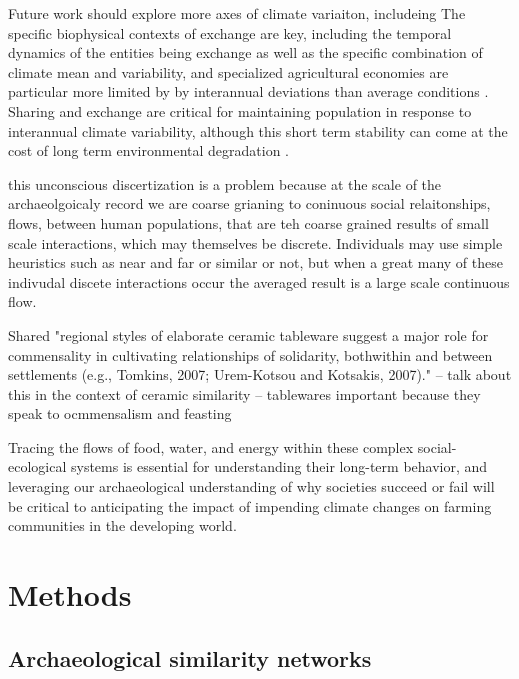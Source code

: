 \documentclass[fleqn,10pt]{wlscirep}
\begin{document}
Future work should explore more axes of climate variaiton, includeing
The specific biophysical contexts of exchange are key, including the temporal dynamics of the entities being exchange as well as the specific combination of climate mean and variability, and specialized agricultural economies are particular more limited by by interannual deviations than average conditions \cite{Freeman2014}. Sharing and exchange are critical for maintaining population in response to interannual climate variability, although this short term stability can come at the cost of long term environmental degradation \cite{Janssen2010}.


this unconscious discertization is a problem because at the scale of the archaeolgoicaly record we are coarse grianing to coninuous social relaitonships, flows, between human populations, that are teh coarse grained results of small scale interactions, which may themselves be discrete. Individuals may use simple heuristics such as near and far or similar or not, but when a great many of these indivudal discete interactions occur the averaged result is a large scale continuous flow.


Shared "regional styles of elaborate ceramic tableware suggest a major role for commensality in cultivating relationships of solidarity, bothwithin and between settlements (e.g., Tomkins, 2007; Urem-Kotsou
and Kotsakis, 2007)." -- talk about this in the context of ceramic similarity -- tablewares important because they speak to ocmmensalism and feasting


Tracing the flows of food, water, and energy within these complex social-ecological systems is essential for understanding their long-term behavior, and leveraging our archaeological understanding of why societies succeed or fail will be critical to anticipating the impact of impending climate changes on farming communities in the developing world.

\section*{Methods}

\subsection*{Archaeological similarity networks}
\end{document}
